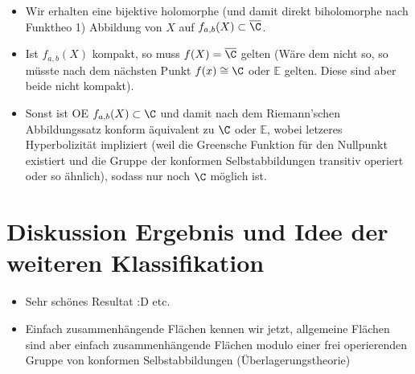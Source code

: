\documentclass{article}
\newcommand{\E}{\mathbb{E}}
\begin{document}
\begin{itemize}
\begin{itemize}
            \end{itemize}
            \item Wir erhalten eine bijektive holomorphe (und damit direkt biholomorphe nach Funktheo 1) Abbildung von $X$ auf $f_{a,b}(X) \subset \overline{\C}$.
            \item Ist $f_{a,b}(X)$ kompakt, so muss $f(X) = \overline{\C}$ gelten (Wäre dem nicht so, so müsste nach dem nächsten Punkt $f(x) \cong \C$ oder $\E$ gelten. Diese sind aber beide nicht kompakt).
            \item Sonst ist OE $f_{a,b}(X) \subset \C$ und damit nach dem Riemann’schen Abbildungssatz konform äquivalent zu $\C$ oder $\mathbb{E}$, wobei letzeres Hyperbolizität impliziert (weil die Greensche Funktion für den Nullpunkt existiert und die Gruppe der konformen Selbstabbildungen transitiv operiert oder so ähnlich), sodass nur noch $\C$ möglich ist.
        \end{itemize}
        \section{Diskussion Ergebnis und Idee der weiteren Klassifikation}
        \begin{itemize}
            \item Sehr schönes Resultat :D etc.
            \item Einfach zusammenhängende Flächen kennen wir jetzt, allgemeine Flächen sind aber einfach zusammenhängende Flächen modulo einer frei operierenden Gruppe von konformen Selbstabbildungen (Überlagerungstheorie)
        \end{itemize}
\end{document}
